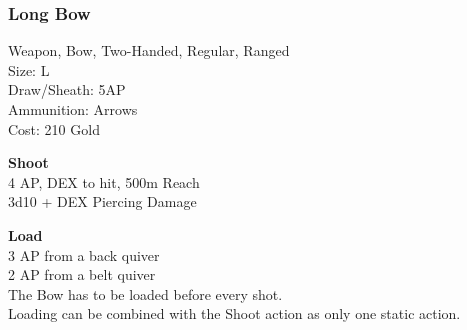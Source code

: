 \subsubsection{Long Bow}\label{weapon:longBow}
Weapon, Bow, Two-Handed, Regular, Ranged\\
Size: L\\
Draw/Sheath: 5AP\\
Ammunition: Arrows\\
Cost: 210 Gold

\textbf{Shoot}\\
4 AP, DEX to hit, 500m Reach\\
3d10 + \texttimes DEX Piercing Damage

\textbf{Load}\\
3 AP from a back quiver\\
2 AP from a belt quiver\\
The Bow has to be loaded before every shot.\\
Loading can be combined with the Shoot action as only one static action.